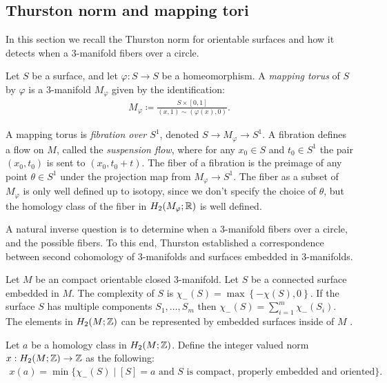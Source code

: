\subsection{Thurston norm and mapping tori}
\label{sec:backgr-thurst-norm}
In this section we recall the Thurston norm for orientable surfaces and how it detects when a 3-manifold fibers over a circle.

 Let $S$ be a surface, and let $\varphi: S \to S$ be a homeomorphism.  A {\it mapping torus} of $S$ by $\varphi$ is a $3$-manifold $M_\varphi$ given by the identification:
\begin{align*}
  M_\varphi \coloneqq \frac{S \times [0,1]}{(x,1) \sim (\varphi(x), 0)}.
\end{align*}

A mapping torus is \emph{fibration over $S^1$}, denoted $S\rightarrow M_\varphi\rightarrow S^1$.
A fibration defines a flow on $M$, called the \emph{suspension flow}, where for any $x_0\in S$ and $t_0\in S^1$ the pair $(x_0,t_0)$ is sent to $(x_0,t_0+t)$.
The fiber of a fibration is the preimage of any point $\theta \in S^1$ under the projection map from $M_{\varphi} \to S^1$.
The fiber as a subset of $M_\varphi$ is only well defined up to isotopy, since we don't specify the choice of $\theta$, but the homology class of the fiber in $H_2(M_{\varphi}; \mathbb{R})$ is well defined.

A natural inverse question is to determine when a 3-manifold fibers over a circle, and the possible fibers.  To this end, Thurston established a correspondence between second cohomology of 3-manifolds and surfaces embedded in 3-manifolds.

 Let $M$ be an compact orientable closed $3$-manifold.
Let $S$ be a connected surface embedded in $M$.  The complexity of $S$ is $\chi_-(S) = \max\left\{-\chi(S),0\right\}$.
If the surface $S$ has multiple components $S_1, \ldots, S_m$ then $\chi_-(S) = \displaystyle\sum_{i=1}^m\chi_-(S_i)$.
The elements in $H_2(M ; \mathbb{Z})$ can be represented by embedded surfaces inside of $M$ \cite[Lemma 1]{thurston1986norm}.


 Let $a$ be a homology class in $H_2(M; \mathbb{Z})$.  Define the integer valued norm $x:H_2(M;\mathbb{Z})\rightarrow \mathbb{Z}$ as the following:
\begin{align*}
  x(a) = \min\{\chi_-(S) \mid [S] = a \text{ and $S$ is compact, properly embedded and oriented}\}.
\end{align*}

